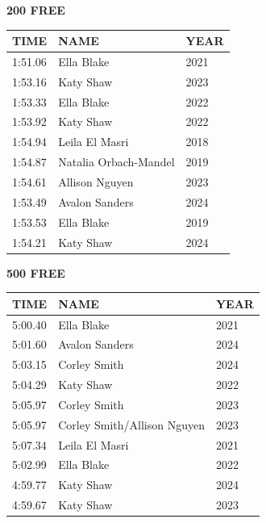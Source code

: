 \begin{table}[H]
\centering
\begin{minipage}[t]{0.48\textwidth}
\centering
\textbf{200 FREE}\\[0.1cm]
\begin{tabular}{@{}p{1.8cm}p{2.8cm}p{1.2cm}@{}}
\hline
    \textbf{TIME} & \textbf{NAME} & \textbf{YEAR} \\
\hline
    1:51.06 & Ella Blake & 2021 \\
    1:53.16 & Katy Shaw & 2023 \\
    1:53.33 & Ella Blake & 2022 \\
    1:53.92 & Katy Shaw & 2022 \\
    1:54.94 & Leila El Masri & 2018 \\
    1:54.87 & Natalia Orbach-Mandel & 2019 \\
    1:54.61 & Allison Nguyen & 2023 \\
    1:53.49 & Avalon Sanders & 2024 \\
    1:53.53 & Ella Blake & 2019 \\
    1:54.21 & Katy Shaw & 2024 \\
\hline
\end{tabular}
\end{minipage}\hfill
\begin{minipage}[t]{0.48\textwidth}
\centering
\textbf{500 FREE}\\[0.1cm]
\begin{tabular}{@{}p{1.8cm}p{2.8cm}p{1.2cm}@{}}
\hline
    \textbf{TIME} & \textbf{NAME} & \textbf{YEAR} \\
\hline
    5:00.40 & Ella Blake & 2021 \\
    5:01.60 & Avalon Sanders & 2024 \\
    5:03.15 & Corley Smith & 2024 \\
    5:04.29 & Katy Shaw & 2022 \\
    5:05.97 & Corley Smith & 2023 \\
    5:05.97 & Corley Smith/Allison Nguyen & 2023 \\
    5:07.34 & Leila El Masri & 2021 \\
    5:02.99 & Ella Blake & 2022 \\
    4:59.77 & Katy Shaw & 2024 \\
    4:59.67 & Katy Shaw & 2023 \\
\hline
\end{tabular}
\end{minipage}
\end{table}

